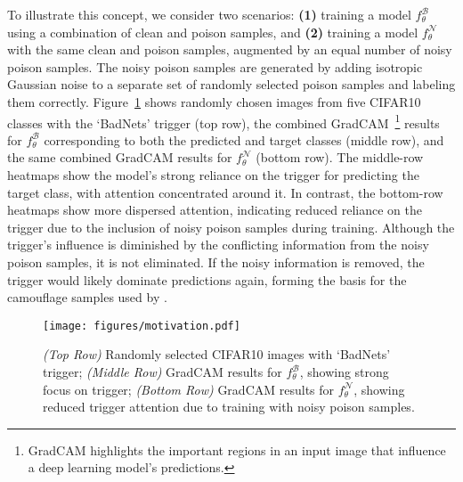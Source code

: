 To illustrate this concept, we consider two scenarios: \textbf{(1)} training a model $f_{\theta}^{\mathcal{B}}$ using a combination of clean and poison samples, and \textbf{(2)} training a model $f_{\theta}^{\mathcal{N}}$ with the same clean and poison samples, augmented by an equal number of noisy poison samples. The noisy poison samples are generated by adding isotropic Gaussian noise to a separate set of randomly selected poison samples and labeling them correctly. Figure~\ref{fig:motivation} shows randomly chosen images from five CIFAR10 classes with the `BadNets' trigger (top row), the combined GradCAM~\cite{gradcam}\footnote{GradCAM highlights the important regions in an input image that influence a deep learning model's predictions.} results for $f_{\theta}^{\mathcal{B}}$ corresponding to both the predicted and target classes (middle row), and the same combined GradCAM results for $f_{\theta}^{\mathcal{N}}$ (bottom row). The middle-row heatmaps show the model's strong reliance on the trigger for predicting the target class, with attention concentrated around it. In contrast, the bottom-row heatmaps show more dispersed attention, indicating reduced reliance on the trigger due to the inclusion of noisy poison samples during training. Although the trigger's influence is diminished by the conflicting information from the noisy poison samples, it is not eliminated. If the noisy information is removed, the trigger would likely dominate predictions again, forming the basis for the camouflage samples used by \methodname.
\begin{figure}[!t]
    \centering
    \texttt{[image: figures/motivation.pdf]}
    \caption{\textit{(Top Row)} Randomly selected CIFAR10 images with `BadNets' trigger; \textit{(Middle Row)} GradCAM results for $f_{\theta}^{\mathcal{B}}$, showing strong focus on trigger; \textit{(Bottom Row)} GradCAM results for $f_{\theta}^{\mathcal{N}}$, showing reduced trigger attention due to training with noisy poison samples.}
    \label{fig:motivation}
\end{figure}

